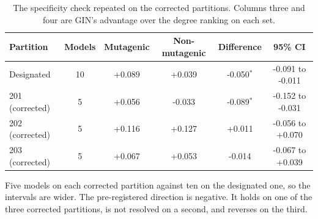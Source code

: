 \begin{table}[htbp]
\centering
\caption{The specificity check repeated on the corrected partitions. Columns three and four are GIN's advantage over the degree ranking on each set.}
\label{tab:dod_replication}
\footnotesize
\setlength{\tabcolsep}{4pt}
\begin{tabular}{lccccc}
\toprule
Partition & Models & Mutagenic & Non-mutagenic & Difference & 95\% CI \\
\midrule
Designated & 10 & +0.089 & +0.039 & -0.050$^{*}$ & -0.091 to -0.011 \\
201 (corrected) & 5 & +0.056 & -0.033 & -0.089$^{*}$ & -0.152 to -0.031 \\
202 (corrected) & 5 & +0.116 & +0.127 & +0.011 & -0.056 to +0.070 \\
203 (corrected) & 5 & +0.067 & +0.053 & -0.014 & -0.067 to +0.039 \\
\bottomrule
\end{tabular}
\begin{flushleft}\footnotesize Five models on each corrected partition against ten on the designated one, so the intervals are wider. The pre-registered direction is negative. It holds on one of the three corrected partitions, is not resolved on a second, and reverses on the third.\end{flushleft}
\end{table}

